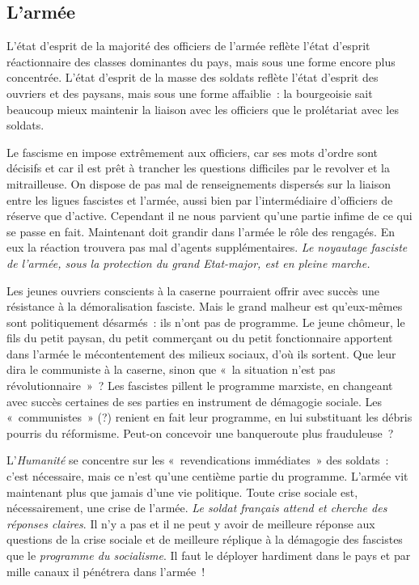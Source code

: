 \documentclass[french,twoside]{book} %
\begin{document}
\subsection[{L’armée}]{L’armée}
\noindent L’état d’esprit de la majorité des officiers de l’armée reflète l’état d’esprit réactionnaire des classes dominantes du pays, mais sous une forme encore plus concentrée. L’état d’esprit de la masse des soldats reflète l’état d’esprit des ouvriers et des paysans, mais sous une forme affaiblie : la bourgeoisie sait beaucoup mieux maintenir la liaison avec les officiers que le prolétariat avec les soldats.\par
Le fascisme en impose extrêmement aux officiers, car ses mots d’ordre sont décisifs et car il est prêt à trancher les questions difficiles par le revolver et la mitrailleuse. On dispose de pas mal de renseignements dispersés sur la liaison entre les ligues fascistes et l’armée, aussi bien par l’intermédiaire d’officiers de réserve que d’active. Cependant il ne nous parvient qu’une partie infime de ce qui se passe en fait. Maintenant doit grandir dans l’armée le rôle des rengagés. En eux la réaction trouvera pas mal d’agents supplémentaires. \emph{Le noyautage fasciste de l’armée, sous la protection du grand Etat-major, est en pleine marche.}\par
Les jeunes ouvriers conscients à la caserne pourraient offrir avec succès une résistance à la démoralisation fasciste.  Mais le grand malheur est qu’eux-mêmes sont politiquement désarmés : ils n’ont pas de programme. Le jeune chômeur, le fils du petit paysan, du petit commerçant ou du petit fonctionnaire apportent dans l’armée le mécontentement des milieux sociaux, d’où ils sortent. Que leur dira le communiste à la caserne, sinon que « la situation n’est pas révolutionnaire » ? Les fascistes pillent le programme marxiste, en changeant avec succès certaines de ses parties en instrument de démagogie sociale. Les « communistes » (?) renient en fait leur programme, en lui substituant les débris pourris du réformisme. Peut-on concevoir une banqueroute plus frauduleuse ?\par
L’\emph{Humanité} se concentre sur les « revendications immédiates » des soldats : c’est nécessaire, mais ce n’est qu’une centième partie du programme. L’armée vit maintenant plus que jamais d’une vie politique. Toute crise sociale est, nécessairement, une crise de l’armée. \emph{Le soldat français attend et cherche des réponses claires}. Il n’y a pas et il ne peut y avoir de meilleure réponse aux questions de la crise sociale et de meilleure réplique à la démagogie des fascistes que le \emph{programme du socialisme}. Il faut le déployer hardiment dans le pays et par mille canaux il pénétrera dans l’armée !
\end{document}

